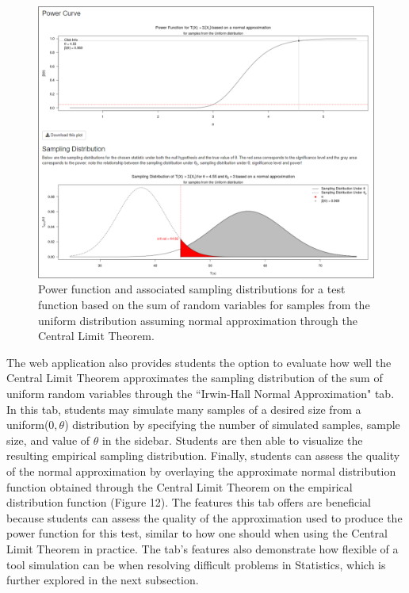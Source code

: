 \documentclass{TISE}
\begin{document}
\newpage

\begin{figure}[H]
	\centering
	\includegraphics[width=.95\textwidth]{fig11.png}
	\caption{Power function and associated sampling distributions  for a test function based on the sum of random variables for samples from the uniform distribution assuming normal approximation through the Central Limit Theorem.}
\end{figure}

The web application also provides students the option to evaluate how well the Central Limit Theorem approximates the sampling distribution of the sum of uniform random variables through the ``Irwin-Hall Normal Approximation" tab. In this tab, students may simulate many samples of a desired size from a uniform($0, \theta$) distribution by specifying the number of simulated samples, sample size, and value of $\theta$ in the sidebar. Students are then able to visualize the resulting empirical sampling distribution. Finally, students can assess the quality of the normal approximation by overlaying the approximate normal distribution function obtained through the Central Limit Theorem on the empirical distribution function (Figure 12). The features this tab offers are beneficial because students can assess the quality of the approximation used to produce the power function for this test, similar to how one should when using the Central Limit Theorem in practice. The tab's features also demonstrate how flexible of a tool simulation can be when resolving difficult problems in Statistics, which is further explored in the next subsection. 
\end{document}
